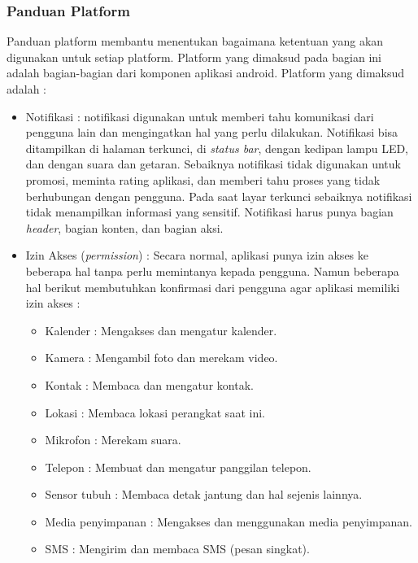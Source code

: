 \subsubsection{Panduan Platform}
Panduan platform membantu menentukan bagaimana ketentuan yang akan digunakan untuk setiap platform. Platform yang dimaksud pada bagian ini adalah bagian-bagian dari komponen aplikasi android. Platform yang dimaksud adalah :
\begin{itemize}
    \item Notifikasi : notifikasi digunakan untuk memberi tahu komunikasi dari pengguna lain dan mengingatkan hal yang perlu dilakukan. Notifikasi bisa ditampilkan di halaman terkunci, di \textit{status bar}, dengan kedipan lampu LED, dan dengan suara dan getaran. Sebaiknya notifikasi tidak digunakan untuk promosi, meminta rating aplikasi, dan memberi tahu proses yang tidak berhubungan dengan pengguna. Pada saat layar terkunci sebaiknya notifikasi tidak menampilkan informasi yang sensitif. Notifikasi harus punya bagian \textit{header}, bagian konten, dan bagian aksi. 
    \item Izin Akses (\textit{permission}) : Secara normal, aplikasi punya izin akses ke beberapa hal tanpa perlu memintanya kepada pengguna. Namun beberapa hal berikut membutuhkan konfirmasi dari pengguna agar aplikasi memiliki izin akses :
    \begin{itemize} \label{subs:izin}
        \item Kalender : Mengakses dan mengatur kalender.
        \item Kamera : Mengambil foto dan merekam video.
        \item Kontak : Membaca dan mengatur kontak.
        \item Lokasi : Membaca lokasi perangkat saat ini.
        \item Mikrofon : Merekam suara.
        \item Telepon : Membuat dan mengatur panggilan telepon.
        \item Sensor tubuh : Membaca detak jantung dan hal sejenis lainnya.
        \item Media penyimpanan : Mengakses dan menggunakan media penyimpanan.
        \item SMS : Mengirim dan membaca SMS (pesan singkat).
    \end{itemize}
\end{itemize}

